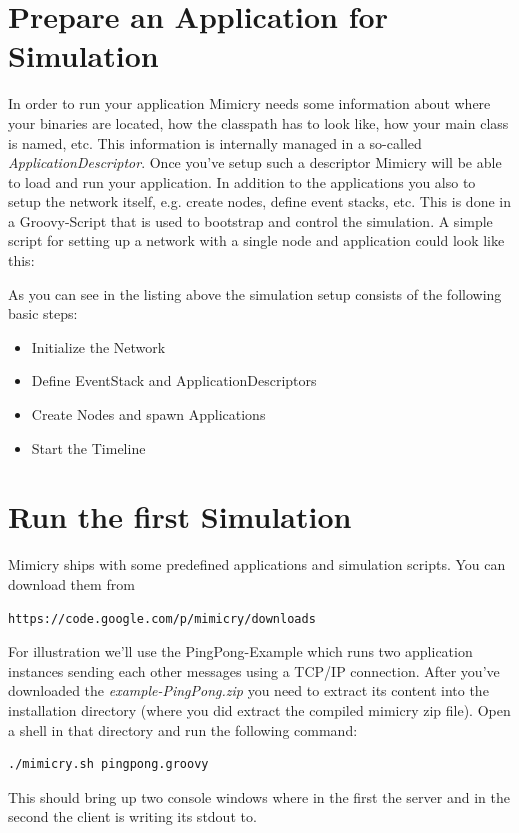 \documentclass[a4paper,oneside]{book}
\begin{document}
\section{Prepare an Application for Simulation}
In order to run your application Mimicry needs some information about where your binaries are located, how the classpath has to look like, how your main class is named, etc. This information is internally managed in a so-called \textit{ApplicationDescriptor}. Once you've setup such a descriptor Mimicry will be able to load and run your application.
In addition to the applications you also to setup the network itself, e.g. create nodes, define event stacks, etc. This is done in a Groovy-Script that is used to bootstrap and control the simulation.
A simple script for setting up a network with a single node and application could look like this:



As you can see in the listing above the simulation setup consists of the following basic steps:
\begin{itemize}
\item Initialize the Network
\item Define EventStack and ApplicationDescriptors
\item Create Nodes and spawn Applications
\item Start the Timeline
\end{itemize}


\section{Run the first Simulation}
Mimicry ships with some predefined applications and simulation scripts. You can download them from
\begin{verbatim}
https://code.google.com/p/mimicry/downloads
\end{verbatim}
For illustration we'll use the PingPong-Example which runs two application instances sending each other messages using a TCP/IP connection.
After you've downloaded the \textit{example-PingPong.zip} you need to extract its content into the installation directory (where you did extract the compiled mimicry zip file).
Open a shell in that directory and run the following command:
\begin{verbatim}
./mimicry.sh pingpong.groovy
\end{verbatim}
This should bring up two console windows where in the first the server and in the second the client is writing its stdout to.
\end{document}
